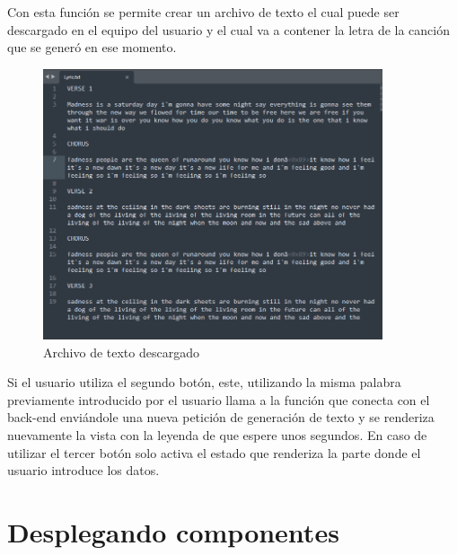 \documentclass[12pt, a4paper, titlepage]{report}
\begin{document}
Con esta función se permite crear un archivo de texto el cual puede ser descargado en el equipo del usuario y el cual va a contener la letra de la canción que se generó en ese momento.
\begin{figure}[H]
	\includegraphics[width=10cm]{./imagenes/Desarrollo/AplicacionWeb/Archivo.png}
	\centering 
	\caption{Archivo de texto descargado}
\end{figure}	
Si el usuario utiliza el segundo botón, este, utilizando la misma palabra previamente introducido por el usuario llama a la función que conecta con el back-end enviándole una nueva petición de generación de texto y se renderiza nuevamente la vista con la leyenda de que espere unos segundos. En caso de utilizar el tercer botón solo activa el estado que renderiza la parte donde el usuario introduce los datos.
\newpage
\section{Desplegando componentes}
\end{document}
